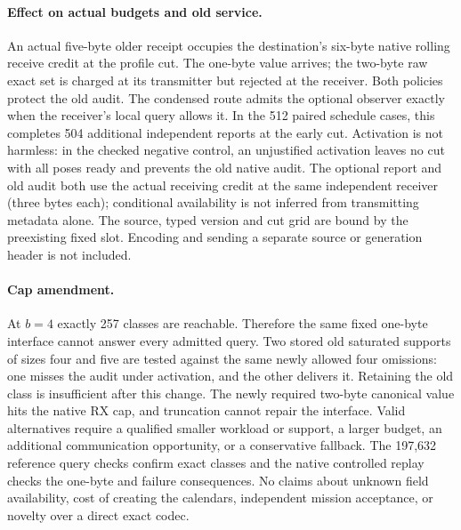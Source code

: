 \documentclass{article}
\begin{document}
\paragraph{Effect on actual budgets and old service.}
An actual five-byte older receipt occupies the destination's
six-byte native rolling receive credit at the profile cut.
The one-byte value arrives; the two-byte raw exact set is
charged at its transmitter but rejected at the receiver.
Both policies protect the old audit. The condensed route
admits the optional observer exactly when the receiver's
local query allows it. In the 512 paired schedule cases,
this completes 504 additional independent reports at
the early cut. Activation is not harmless: in the checked
negative control, an unjustified activation leaves no cut
with all poses ready and prevents the old native audit.
The optional report and old audit both use the actual receiving
credit at the same independent receiver (three bytes each);
conditional availability is not inferred from transmitting
metadata alone. The source, typed version and cut grid are
bound by the preexisting fixed slot. Encoding and sending a
separate source or generation header is not included.

\paragraph{Cap amendment.}
At \(b=4\) exactly 257 classes are reachable. Therefore the
same fixed one-byte interface cannot answer every admitted
query. Two stored old saturated supports of sizes four and
five are tested against the same newly allowed four omissions:
one misses the audit under activation, and the other delivers it.
Retaining the old class is insufficient after this change.
The newly required two-byte canonical value hits the native
RX cap, and truncation cannot repair the interface. Valid
alternatives require a qualified smaller workload or support,
a larger budget, an additional communication opportunity, or
a conservative fallback. The 197,632 reference query checks
confirm exact classes and the native controlled replay checks
the one-byte and failure consequences. No claims about unknown
field availability, cost of creating the calendars, independent
mission acceptance, or novelty over a direct exact codec.
\end{document}

